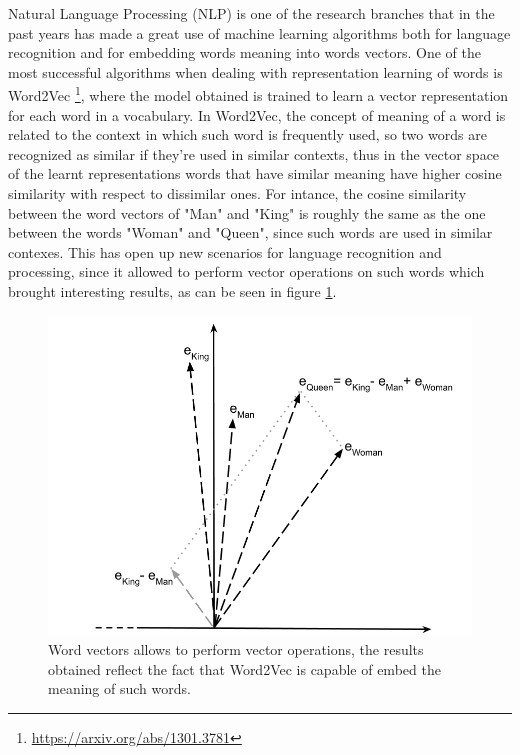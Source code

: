 \documentclass[%
    corpo=13.5pt,
    twoside,
    oldstyle,
    tipotesi=magistrale,
    greek,
    evenboxes
]{toptesi}
\begin{document}
Natural Language Processing (NLP) is one of the research branches that in
the past years has made a great use of machine learning algorithms both for
language recognition and for embedding words meaning into words vectors.
One of the most successful algorithms when dealing with representation learning
of words is Word2Vec \footnote{\url{https://arxiv.org/abs/1301.3781}}, where
the model obtained is trained to learn a vector representation for each word in
a vocabulary.
In Word2Vec, the concept of meaning of a word is related to the context in
which such word is frequently used, so two words are recognized as similar if
they're used in similar contexts, thus in the vector space of the learnt
representations words that have similar meaning have higher cosine similarity
with respect to dissimilar ones.
For intance, the cosine similarity between the word vectors of "Man" and "King"
is roughly the same as the one between the words "Woman" and "Queen", since such
words are used in similar contexes. This has open up new scenarios for
language recognition and processing, since it allowed to perform vector
operations on such words which brought interesting results, as can be seen
in figure \ref{fig:word2vec}.

\begin{figure}[h]
    \centering
    \includegraphics[scale=0.4]{img/word2vec.png}
    \caption{
        Word vectors allows to perform vector operations, the results
        obtained reflect the fact that Word2Vec is capable of embed the
        meaning of such words.
    }
    \label{fig:word2vec}
    \end{figure}
\end{document}
